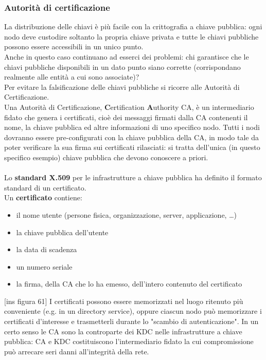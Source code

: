 \subsubsection{Autorità di certificazione}
La distribuzione delle chiavi è più facile con la crittografia a chiave pubblica: ogni nodo deve custodire soltanto la propria chiave privata e tutte le chiavi pubbliche possono essere accessibili in un unico punto. \\
Anche in questo caso continuano ad esserci dei problemi: chi garantisce che le chiavi pubbliche disponibili in un dato punto siano corrette (corrispondano realmente alle entità a cui sono associate)? \\
Per evitare la falsificazione delle chiavi pubbliche si ricorre alle Autorità di Certificazione. \\
Una Autorità di Certificazione, \textbf{C}ertification \textbf{A}uthority CA, è un intermediario fidato che genera i certificati, cioè dei messaggi firmati dalla CA contenenti il nome, la chiave pubblica ed altre informazioni di uno specifico nodo. Tutti i nodi dovranno essere pre-configurati con la chiave pubblica della CA, in modo tale da poter verificare la sua firma sui certificati rilasciati: si tratta dell’unica (in questo specifico esempio) chiave pubblica che devono conoscere a priori. \\ \\
Lo \textbf{standard X.509} per le infrastrutture a chiave pubblica ha definito il formato standard di un certificato. \\
Un \textbf{certificato} contiene:
\begin{itemize}
\item il nome utente (persone fisica, organizzazione, server, applicazione, …)
\item la chiave pubblica dell’utente
\item la data di scadenza
\item un numero seriale
\item la firma, della CA che lo ha emesso, dell’intero contenuto del certificato
\end{itemize}
[ins figura 61]
I certificati possono essere memorizzati nel luogo ritenuto più conveniente (e.g. in un directory service), oppure
ciascun nodo può memorizzare i certificati d’interesse e trasmetterli durante lo "scambio di autenticazione". 
In un certo senso le CA sono la controparte dei KDC nelle infrastrutture a chiave pubblica: CA e KDC costituiscono l'intermediario fidato la cui compromissione può arrecare seri danni all'integrità della rete. \\ \\
